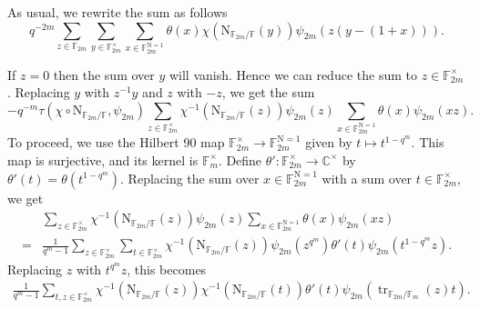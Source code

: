 \documentclass[12pt, reqno]{amsart}
\theoremstyle{definition}
\theoremstyle{definition}
\theoremstyle{definition}
\newcommand{\cComplex}{\mathbb{C}}
\newcommand{\multiplicativegroup}[1]{#1^{\times}}
\newcommand{\fieldCharacter}{\psi}
\newcommand{\trace}{\operatorname{tr}}
\newcommand{\aFieldNorm}{\mathrm{N}}
\newcommand{\finiteField}{\mathbb{F}}
\newcommand{\finiteFieldExtension}[1]{\finiteField_{#1}}
\newcommand{\NormOneGroup}[1]{\finiteFieldExtension{#1}^{\aFieldNorm = 1}}
\begin{document}
As usual, we rewrite the sum as follows
$$q^{-2m} \sum_{z \in \finiteFieldExtension{2m}} \sum_{y \in \multiplicativegroup{\finiteFieldExtension{2m}}} \sum_{x \in \NormOneGroup{2m}} \theta \left(x\right) \chi\left(\aFieldNorm_{\finiteFieldExtension{2m} \slash \finiteField}\left(y\right)\right) \fieldCharacter_{2m}\left(z\left(y-\left(1+x\right)\right)\right).$$

If $z=0$ then the sum over $y$ will vanish. Hence we can reduce the sum to $z \in \multiplicativegroup{\finiteFieldExtension{2m}}$. Replacing $y$ with $z^{-1} y$ and $z$ with $-z$, we get the sum
$$-q^{-m} \tau\left(\chi \circ \aFieldNorm_{\finiteFieldExtension{2m} \slash \finiteField}, \fieldCharacter_{2m}\right) \sum_{z \in \multiplicativegroup{\finiteFieldExtension{2m}}} \chi^{-1}\left(\aFieldNorm_{\finiteFieldExtension{2m} \slash \finiteField}\left(z\right)\right) \fieldCharacter_{2m}\left(z\right)  \sum_{x \in \NormOneGroup{2m}} \theta \left(x\right) \fieldCharacter_{2m}\left(xz\right).$$
To proceed, we use the Hilbert 90 map $\multiplicativegroup{\finiteFieldExtension{2m}} \to \NormOneGroup{2m}$ given by $t \mapsto t^{1 - q^m}$. This map is surjective, and its kernel is $\multiplicativegroup{\finiteFieldExtension{m}}$. Define $\theta' \colon \multiplicativegroup{\finiteFieldExtension{2m}} \to \multiplicativegroup{\cComplex}$ by $\theta'\left(t\right) = \theta\left(t^{1-q^m}\right)$. Replacing the sum over $x \in \NormOneGroup{2m}$ with a sum over $t \in \multiplicativegroup{\finiteFieldExtension{2m}}$, we get \begin{align*}
	& \sum_{z \in \multiplicativegroup{\finiteFieldExtension{2m}}} \chi^{-1}\left(\aFieldNorm_{\finiteFieldExtension{2m} \slash \finiteField}\left(z\right)\right) \fieldCharacter_{2m}\left(z\right) \sum_{x \in \NormOneGroup{2m}} \theta \left(x\right) \fieldCharacter_{2m}\left(xz\right) \\
	= & \frac{1}{q^m-1}\sum_{z \in \multiplicativegroup{\finiteFieldExtension{2m}}} \sum_{t \in \multiplicativegroup{\finiteFieldExtension{2m}}} \chi^{-1}\left(\aFieldNorm_{\finiteFieldExtension{2m} \slash \finiteField}\left(z\right)\right) \fieldCharacter_{2m}\left(z^{q^m}\right) \theta' \left(t\right) \fieldCharacter_{2m}\left(t^{1-q^m} z\right).
\end{align*}
Replacing $z$ with $t^{q^m} z$, this becomes
\begin{align*}
	\frac{1}{q^m-1}\sum_{t,z \in \multiplicativegroup{\finiteFieldExtension{2m}}} \chi^{-1}\left(\aFieldNorm_{\finiteFieldExtension{2m} \slash \finiteField}\left(z\right)\right) \chi^{-1}\left(\aFieldNorm_{\finiteFieldExtension{2m} \slash \finiteField}\left(t\right)\right) \theta' \left(t\right) \fieldCharacter_{2m}\left(\trace_{\finiteFieldExtension{2m} \slash \finiteFieldExtension{m}}\left(z\right) t\right).
\end{align*}
\end{document}
